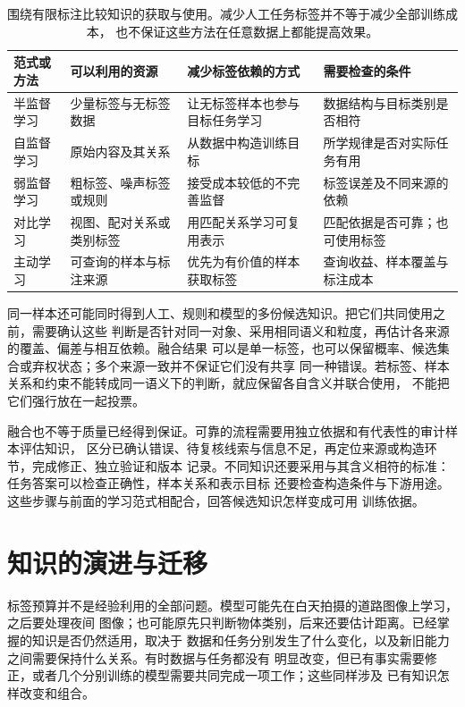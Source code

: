 \begin{table}[htbp]
  \centering
  \small
  \begin{tabularx}{\linewidth}{@{}lXXX@{}}
    \toprule
    \textbf{范式或方法} & \textbf{可以利用的资源} & \textbf{减少标签依赖的方式} & \textbf{需要检查的条件} \\
    \midrule
    半监督学习 & 少量标签与无标签数据 & 让无标签样本也参与目标任务学习 & 数据结构与目标类别是否相符 \\
    自监督学习 & 原始内容及其关系 & 从数据中构造训练目标 & 所学规律是否对实际任务有用 \\
    弱监督学习 & 粗标签、噪声标签或规则 & 接受成本较低的不完善监督 & 标签误差及不同来源的依赖 \\
    对比学习 & 视图、配对关系或类别标签 & 用匹配关系学习可复用表示 & 匹配依据是否可靠；也可使用标签 \\
    主动学习 & 可查询的样本与标注来源 & 优先为有价值的样本获取标签 & 查询收益、样本覆盖与标注成本 \\
    \bottomrule
  \end{tabularx}
  \caption{围绕有限标注比较知识的获取与使用。减少人工任务标签并不等于减少全部训练成本，
  也不保证这些方法在任意数据上都能提高效果。}
  \label{tab:efficient-knowledge-use-comparison}
\end{table}
\FloatBarrier

同一样本还可能同时得到人工、规则和模型的多份候选知识。把它们共同使用之前，需要确认这些
判断是否针对同一对象、采用相同语义和粒度，再估计各来源的覆盖、偏差与相互依赖。融合结果
可以是单一标签，也可以保留概率、候选集合或弃权状态；多个来源一致并不保证它们没有共享
同一种错误。若标签、样本关系和约束不能转成同一语义下的判断，就应保留各自含义并联合使用，
不能把它们强行放在一起投票。

融合也不等于质量已经得到保证。可靠的流程需要用独立依据和有代表性的审计样本评估知识，
区分已确认错误、待复核线索与信息不足，再定位来源或构造环节，完成修正、独立验证和版本
记录。不同知识还要采用与其含义相符的标准：任务答案可以检查正确性，样本关系和表示目标
还要检查构造条件与下游用途。这些步骤与前面的学习范式相配合，回答候选知识怎样变成可用
训练依据。

\section{知识的演进与迁移}
\label{sec:knowledge-evolution-and-transfer-overview}

标签预算并不是经验利用的全部问题。模型可能先在白天拍摄的道路图像上学习，之后要处理夜间
图像；也可能原先只判断物体类别，后来还要估计距离。已经掌握的知识是否仍然适用，取决于
数据和任务分别发生了什么变化，以及新旧能力之间需要保持什么关系。有时数据与任务都没有
明显改变，但已有事实需要修正，或者几个分别训练的模型需要共同完成一项工作；这些同样涉及
已有知识怎样改变和组合。

